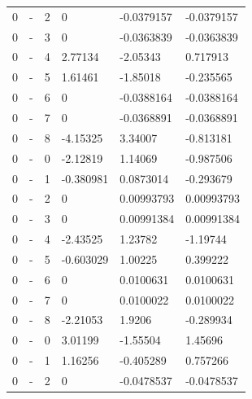 \begin{longtable}
{}0 & \allowbreak{}-\allowbreak{} & 2 & 0 & -0.0379157 & -0.0379157 \\
{}0 & \allowbreak{}-\allowbreak{} & 3 & 0 & -0.0363839 & -0.0363839 \\
{}0 & \allowbreak{}-\allowbreak{} & 4 & 2.77134 & -2.05343 & 0.717913 \\
{}0 & \allowbreak{}-\allowbreak{} & 5 & 1.61461 & -1.85018 & -0.235565 \\
{}0 & \allowbreak{}-\allowbreak{} & 6 & 0 & -0.0388164 & -0.0388164 \\
{}0 & \allowbreak{}-\allowbreak{} & 7 & 0 & -0.0368891 & -0.0368891 \\
{}0 & \allowbreak{}-\allowbreak{} & 8 & -4.15325 & 3.34007 & -0.813181 \\
{}0 & - & 0 & -2.12819 & 1.14069 & -0.987506 \\
{}0 & - & 1 & -0.380981 & 0.0873014 & -0.293679 \\
{}0 & - & 2 & 0 & 0.00993793 & 0.00993793 \\
{}0 & - & 3 & 0 & 0.00991384 & 0.00991384 \\
{}0 & - & 4 & -2.43525 & 1.23782 & -1.19744 \\
{}0 & - & 5 & -0.603029 & 1.00225 & 0.399222 \\
{}0 & - & 6 & 0 & 0.0100631 & 0.0100631 \\
{}0 & - & 7 & 0 & 0.0100022 & 0.0100022 \\
{}0 & - & 8 & -2.21053 & 1.9206 & -0.289934 \\
{}0 & \allowbreak{}-\allowbreak{} & 0 & 3.01199 & -1.55504 & 1.45696 \\
{}0 & \allowbreak{}-\allowbreak{} & 1 & 1.16256 & -0.405289 & 0.757266 \\
{}0 & \allowbreak{}-\allowbreak{} & 2 & 0 & -0.0478537 & -0.0478537 \\

\end{longtable}
